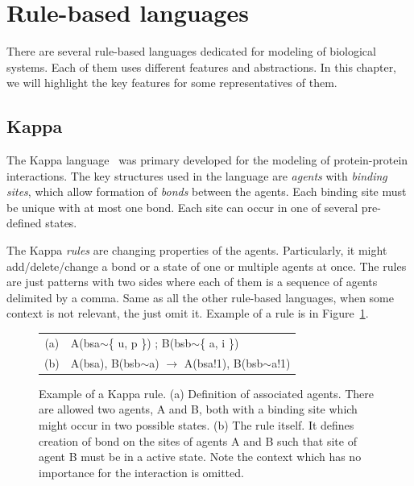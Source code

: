 \documentclass[12pt]{fithesis2}
\begin{document}
\section{Rule-based languages}
\label{rule_based_languages}

There are several rule-based languages dedicated for modeling of biological systems. Each of them uses different features and abstractions. In this chapter, we will highlight the key features for some representatives of them.

\subsection{Kappa}
\label{kappa}

The Kappa language~\cite{kappa_formal} was primary developed for the modeling of protein-protein interactions. The key structures used in the language are \emph{agents} with \emph{binding sites}, which allow formation of \emph{bonds} between the agents. Each binding site must be unique with at most one bond. Each site can occur in one of several pre-defined states.

The Kappa \emph{rules} are changing properties of the agents. Particularly, it might add/delete/change a bond or a state of one or multiple agents at once. The rules are just patterns with two sides where each of them is a sequence of agents delimited by a comma. Same as all the other rule-based languages, when some context is not relevant, the just omit it. Example of a rule is in Figure~\ref{kappa-rule}.

\begin{figure}[!h]
\begin{center}
\begin{tabular}{c l}
(a) & A(bsa$\sim$\{ u, p \}) ; B(bsb$\sim$\{ a, i \}) \\
(b) & A(bsa), B(bsb$\sim$a) $\rightarrow$ A(bsa!1), B(bsb$\sim$a!1) \\
\end{tabular}
\end{center}
\caption{Example of a Kappa rule. (a) Definition of associated agents. There are allowed two agents, A and B, both with a binding site which might occur in two possible states. (b) The rule itself. It defines creation of bond on the sites of agents A and B such that site of agent B must be in a active state. Note the context which has no importance for the interaction is omitted.}\label{kappa-rule}
\end{figure}
\end{document}
